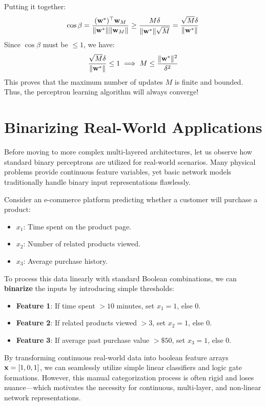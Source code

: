 Putting it together:
\[
\cos \beta = \frac{(\mathbf{w}^*)^\top \mathbf{w}_M}{\|\mathbf{w}^*\| \|\mathbf{w}_M\|} \geq \frac{M \delta}{\|\mathbf{w}^*\| \sqrt{M}} = \frac{\sqrt{M} \delta}{\|\mathbf{w}^*\|}
\]
Since $\cos \beta$ must be $\leq 1$, we have:
\[
\frac{\sqrt{M} \delta}{\|\mathbf{w}^*\|} \leq 1 \implies M \leq \frac{\|\mathbf{w}^*\|^2}{\delta^2}
\]
This proves that the maximum number of updates $M$ is finite and bounded. Thus, the perceptron learning algorithm will always converge!


\section{Binarizing Real-World Applications}

Before moving to more complex multi-layered architectures, let us observe how standard binary perceptrons are utilized for real-world scenarios. Many physical problems provide continuous feature variables, yet basic network models traditionally handle binary input representations flawlessly.

Consider an e-commerce platform predicting whether a customer will purchase a product:
\begin{itemize}
    \item $x_1$: Time spent on the product page.
    \item $x_2$: Number of related products viewed.
    \item $x_3$: Average purchase history.
\end{itemize}

To process this data linearly with standard Boolean combinations, we can \textbf{binarize} the inputs by introducing simple thresholds:
\begin{itemize}
    \item \textbf{Feature 1}: If time spent $> 10$ minutes, set $x_1 = 1$, else $0$.
    \item \textbf{Feature 2}: If related products viewed $> 3$, set $x_2 = 1$, else $0$.
    \item \textbf{Feature 3}: If average past purchase value $> \$50$, set $x_3 = 1$, else $0$.
\end{itemize}

By transforming continuous real-world data into boolean feature arrays $\mathbf{x} = [1, 0, 1]$, we can seamlessly utilize simple linear classifiers and logic gate formations. However, this manual categorization process is often rigid and loses nuance—which motivates the necessity for continuous, multi-layer, and non-linear network representations.

